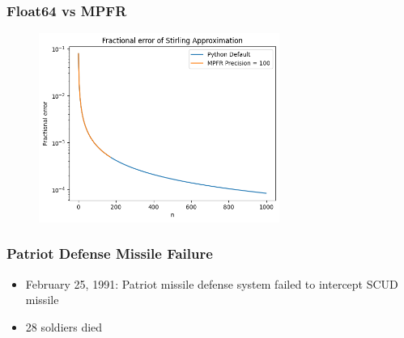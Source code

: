 \documentclass[10pt]{beamer}
\begin{document}
\begin{frame}
    \frametitle{Float64 vs MPFR}
    \begin{figure}
        \centering
        \includegraphics[width=0.7\textwidth]{fractional_error.png}
    \end{figure}
\end{frame}

\begin{frame}
    \frametitle{Patriot Defense Missile Failure}
    \begin{itemize}
        \item February 25, 1991: Patriot missile defense system failed to intercept SCUD missile
        \item 28 soldiers died
    \end{itemize}
\end{frame}
\end{document}
